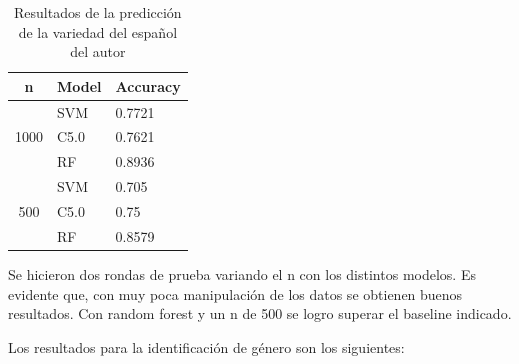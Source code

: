 \documentclass[11pt,a4paper]{article}
\begin{document}
\begin{table}[H]
\centering
\begin{tabular}{|c|l|l|}
\hline
n                     & \multicolumn{1}{c|}{Model} & \multicolumn{1}{c|}{Accuracy} \\ \hline
\multirow{3}{*}{1000} & SVM                        & 0.7721                        \\ \cline{2-3} 
                      & C5.0                       & 0.7621                        \\ \cline{2-3} 
                      & RF                         & 0.8936                              \\ \hline
\multirow{3}{*}{500}  & SVM                        & 0.705                         \\ \cline{2-3} 
                      & C5.0                       & 0.75                          \\ \cline{2-3} 
                      & RF                         & 0.8579                        \\ \hline

\end{tabular}
\caption{Resultados de la predicción de la variedad del español del autor}
\end{table}

Se hicieron dos rondas de prueba variando el n con los distintos modelos. Es evidente que, con muy poca manipulación de los datos se obtienen buenos resultados. Con random forest y un n de 500 se logro superar el baseline indicado.

Los resultados para la identificación de género son los siguientes:
\end{document}
